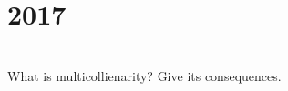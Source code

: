 \section*{2017}
\vspace{-.5cm}
\hrulefill \smallskip\\
 What is multicollienarity? Give its consequences.